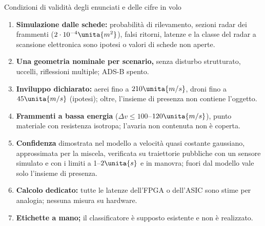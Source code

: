 \begin{riquadro}{Condizioni di validità degli enunciati e delle cifre in volo}
\begin{enumerate}[label=\arabic*.,itemsep=1pt]
\item \textbf{Simulazione dalle schede:} probabilità di rilevamento, sezioni radar dei frammenti ($2\cdot10^{-4}\unita{m^2}$), falsi ritorni, latenze e la classe del radar a scansione elettronica sono ipotesi o valori di schede non aperte.
\item \textbf{Una geometria nominale per scenario,} senza disturbo strutturato, uccelli, riflessioni multiple; ADS-B spento.
\item \textbf{Inviluppo dichiarato:} aerei fino a $210\unita{m/s}$, droni fino a $45\unita{m/s}$ (ipotesi); oltre, l'insieme di presenza non contiene l'oggetto.
\item \textbf{Frammenti a bassa energia} ($\Delta v\le100$--$120\unita{m/s}$), punto materiale con resistenza isotropa; l'avaria non contenuta non è coperta.
\item \textbf{Confidenza} dimostrata nel modello a velocità quasi costante gaussiano, approssimata per la miscela, verificata su traiettorie pubbliche con un sensore simulato e con i limiti a 1--$2\unita{s}$ e in manovra; fuori dal modello vale solo l'insieme di presenza.
\item \textbf{Calcolo dedicato:} tutte le latenze dell'FPGA o dell'ASIC sono stime per analogia; nessuna misura su hardware.
\item \textbf{Etichette a mano;} il classificatore è supposto esistente e non è realizzato.
\end{enumerate}
\end{riquadro}
